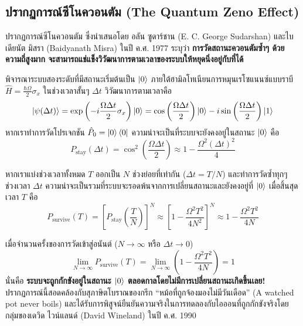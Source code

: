 \subsection{ปรากฏการณ์ซีโนควอนตัม (The Quantum Zeno Effect)}
ปรากฏการณ์ซีโนควอนตัม ซึ่งนำเสนอโดย อลัน ซูดาร์ชาน (E. C. George Sudarshan) และไบเดียนัต มิสรา (Baidyanath Misra) ในปี ค.ศ. 1977 ระบุว่า \textbf{การวัดสถานะควอนตัมซ้ำๆ ด้วยความถี่สูงมาก จะสามารถแช่แข็งวิวัฒนาการตามเวลาของระบบให้หยุดนิ่งอยู่กับที่ได้}

พิจารณาระบบสองระดับที่มีสถานะเริ่มต้นเป็น $\ket{0}$ ภายใต้ฮามิลโทเนียนการหมุนเรโซแนนซ์แบบราบี $\hat{H} = \frac{\hbar\Omega}{2}\sigma_x$ ในช่วงเวลาสั้นๆ $\Delta t$ วิวัฒนาการตามเวลาคือ
\begin{equation}
\ket{\psi(\Delta t)} = \exp\left( -i\frac{\Omega \Delta t}{2}\sigma_x \right)\ket{0} = \cos\left(\frac{\Omega \Delta t}{2}\right)\ket{0} - i\sin\left(\frac{\Omega \Delta t}{2}\right)\ket{1}
\end{equation}
หากเราทำการวัดโปรเจกชัน $\hat{P}_0 = \ket{0}\bra{0}$ ความน่าจะเป็นที่ระบบจะยังคงอยู่ในสถานะ $\ket{0}$ คือ
\begin{equation}
P_{\text{stay}}(\Delta t) = \cos^2\left(\frac{\Omega \Delta t}{2}\right) \approx 1 - \frac{\Omega^2 (\Delta t)^2}{4}
\end{equation}

หากเราแบ่งช่วงเวลาทั้งหมด $T$ ออกเป็น $N$ ช่วงย่อยที่เท่ากัน ($\Delta t = T/N$) และทำการวัดซ้ำทุกๆ ช่วงเวลา $\Delta t$ ความน่าจะเป็นรวมที่ระบบจะรอดพ้นจากการเปลี่ยนสถานะและยังคงอยู่ที่ $\ket{0}$ เมื่อสิ้นสุดเวลา $T$ คือ
\begin{equation}
P_{\text{survive}}(T) = \left[ P_{\text{stay}}\left(\frac{T}{N}\right) \right]^N \approx \left[ 1 - \frac{\Omega^2 T^2}{4 N^2} \right]^N \approx 1 - \frac{\Omega^2 T^2}{4 N}
\end{equation}

เมื่อจำนวนครั้งของการวัดเข้าสู่อนันต์ ($N \to \infty$ หรือ $\Delta t \to 0$)
\begin{equation}
\lim_{N \to \infty} P_{\text{survive}}(T) = \lim_{N \to \infty} \left( 1 - \frac{\Omega^2 T^2}{4 N} \right) = 1
\label{eq:zeno_limit}
\end{equation}
นั่นคือ \textbf{ระบบจะถูกกักขังอยู่ในสถานะ $\ket{0}$ ตลอดกาลโดยไม่มีการเปลี่ยนสถานะเกิดขึ้นเลย!} ปรากฏการณ์นี้สอดคล้องกับสุภาษิตโบราณของกรีก ``หม้อที่ถูกจ้องมองไม่มีวันเดือด'' (A watched pot never boils) และได้รับการพิสูจน์ยืนยันความจริงในการทดลองกับไอออนที่ถูกกักขังจริงโดยกลุ่มของเดวิด ไวน์แลนด์ (David Wineland) ในปี ค.ศ. 1990

